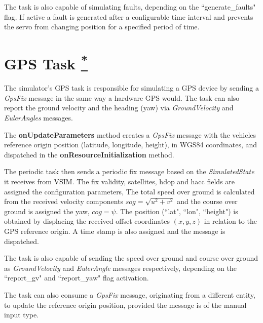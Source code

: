 \documentclass[10pt,a4paper]{article}
\begin{document}
\par The task is also capable of simulating faults, depending on the ``generate\_faults" flag. If active a fault is generated after a configurable time interval and prevents the servo from changing position for a specified period of time.

\section{GPS Task \href{https://www.lsts.pt/docs/dune/dune-2017.01.0-dmsmw/db/da2/structSimulators_1_1GPS_1_1Task.html}{\textsuperscript{*}}}
\label{gps_task}

\par The simulator's GPS task is responsible for simulating a GPS device by sending a \textit{GpsFix} message in the same way a hardware GPS would. The task can also report the ground velocity and the heading (yaw) via \textit{GroundVelocity} and \textit{EulerAngles} messages.

\par The \textbf{onUpdateParameters} method creates a \textit{GpsFix} message with the vehicles reference origin position (latitude, longitude, height), in WGS84 coordinates, and dispatched in the \textbf{onResourceInitialization} method.

\par The periodic task then sends a periodic fix message based on the \textit{SimulatedState} it receives from VSIM. The fix validity, satellites, hdop and hacc fields are assigned the configuration parameters, The total speed over ground is calculated from the received velocity components $sog = \sqrt{u^2 + v^2}$ and the course over ground is assigned the yaw, $cog = \psi$. The position (``lat", ``lon", ``height") is obtained by displacing the received offset coordinates $\left(x,y,z\right)$ in relation to the GPS reference origin. A time stamp is also assigned and the message is dispatched.

\par The task is also capable of sending the speed over ground and course over ground as \textit{GroundVelocity} and \textit{EulerAngle} messages respectively, depending on the ``report\_gv" and ``report\_yaw" flag activation.

\par The task can also consume a \textit{GpsFix} message, originating from a different entity, to update the reference origin position, provided the message is of the manual input type.
\end{document}
